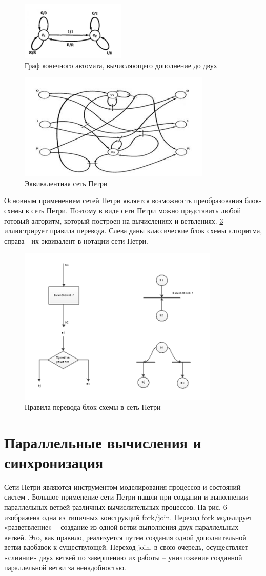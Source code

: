 \begin{figure}[ht]
\centerline{\includegraphics[width=0.3\linewidth]{images/image3.png}}
\caption{Граф конечного автомата, вычисляющего дополнение до двух}
\label{fig3}
\end{figure}

\begin{figure}[ht]
\centerline{\includegraphics[width=0.3\linewidth]{images/image4.png}}
\caption{Эквивалентная сеть Петри}
\label{fig4}
\end{figure}

Основным применением сетей Петри является возможность преобразования блок-схемы в сеть Петри. Поэтому в виде сети Петри можно представить любой готовый алгоритм, который построен на вычислениях и ветвлениях. \ref{fig5}  иллюстрирует правила перевода. Слева даны классические блок схемы алгоритма, справа - их эквивалент в нотации сети Петри.

\begin{figure}[ht]
\centerline{\includegraphics[width=0.5\linewidth]{images/image5.png}}
\caption{Правила перевода блок-схемы в сеть Петри}
\label{fig5}
\end{figure}

\section{Параллельные вычисления и синхронизация}

Сети Петри являются инструментом моделирования процессов и состояний систем \cite{Tsvetkov4}. Большое применение сети Петри нашли при создании и выполнении параллельных ветвей различных вычислительных процессов. На рис. 6 изображена одна из типичных конструкций fork/join. Переход fork моделирует «разветвление» – создание из одной ветви выполнения двух параллельных ветвей. Это, как правило, реализуется путем создания одной дополнительной ветви вдобавок к существующей. Переход join, в свою очередь, осуществляет «слияние» двух ветвей по завершению их работы – уничтожение созданной параллельной ветви за ненадобностью.

